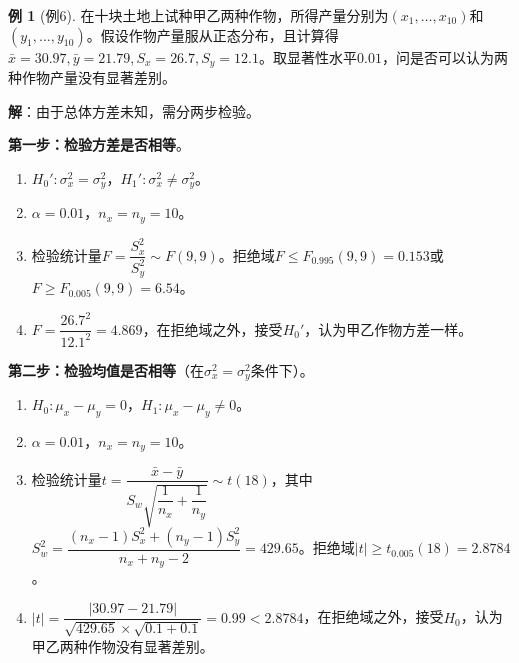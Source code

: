 \documentclass[11pt,a4paper]{report}
\theoremstyle{definition}
\newtheorem{example}{例}[chapter]
\theoremstyle{plain}
\begin{document}
\begin{example}[例6]
在十块土地上试种甲乙两种作物，所得产量分别为$(x_1,\ldots,x_{10})$和$(y_1,\ldots,y_{10})$。假设作物产量服从正态分布，且计算得$\bar{x}=30.97,\bar{y}=21.79,S_x=26.7,S_y=12.1$。取显著性水平$0.01$，问是否可以认为两种作物产量没有显著差别。

\textbf{解}：由于总体方差未知，需分两步检验。

\textbf{第一步：检验方差是否相等}。
\begin{enumerate}[label=步骤\arabic*.,leftmargin=2em]
    \item $H_0':\sigma_x^2=\sigma_y^2$，$H_1':\sigma_x^2\neq\sigma_y^2$。
    \item $\alpha=0.01$，$n_x=n_y=10$。
    \item 检验统计量$F=\dfrac{S_x^2}{S_y^2}\sim F(9,9)$。拒绝域$F\leq F_{0.995}(9,9)=0.153$或$F\geq F_{0.005}(9,9)=6.54$。
    \item $F=\dfrac{26.7^2}{12.1^2}=4.869$，在拒绝域之外，接受$H_0'$，认为甲乙作物方差一样。
\end{enumerate}

\textbf{第二步：检验均值是否相等}（在$\sigma_x^2=\sigma_y^2$条件下）。
\begin{enumerate}[label=步骤\arabic*.,leftmargin=2em]
    \item $H_0:\mu_x-\mu_y=0$，$H_1:\mu_x-\mu_y\neq 0$。
    \item $\alpha=0.01$，$n_x=n_y=10$。
    \item 检验统计量$t=\dfrac{\bar{x}-\bar{y}}{S_w\sqrt{\dfrac{1}{n_x}+\dfrac{1}{n_y}}}\sim t(18)$，其中$S_w^2=\dfrac{(n_x-1)S_x^2+(n_y-1)S_y^2}{n_x+n_y-2}=429.65$。拒绝域$|t|\geq t_{0.005}(18)=2.8784$。
    \item $|t|=\dfrac{|30.97-21.79|}{\sqrt{429.65}\times\sqrt{0.1+0.1}}=0.99<2.8784$，在拒绝域之外，接受$H_0$，认为甲乙两种作物没有显著差别。
\end{enumerate}
\end{example}
\end{document}
